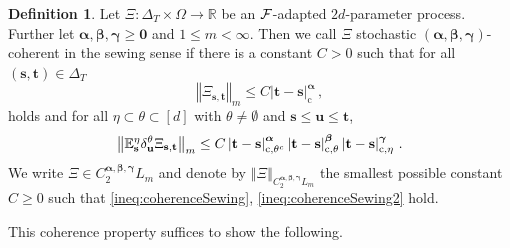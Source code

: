 \documentclass[12pt]{article}
\numberwithin{equation}{section}
\theoremstyle{plain}
\theoremstyle{definition}
\newtheorem{definition}[theorem]{Definition}
\newcommand{\abs}[1]{\left\vert #1 \right\vert}
\newcommand{\compAbs}[1]{\left\vert#1\right\vert_{\text{c}}}
\newcommand{\norm}[1]{\left\Vert #1\right\Vert}
\def\bR{\mathbb{R}}\def\bS{\mathbb{S}}
\def\bE{\mathbb{E}}\def\bW{\mathbb{W}}
\def\fs{\mathbf s}\def\ft{\mathbf t}
\def\fu{\mathbf u}\def\fv{\mathbf v}
\def\falpha{{\boldsymbol\alpha}}
\def\fbeta{{\boldsymbol\beta}}
\def\fgamma{{\boldsymbol\gamma}}
\def\foo{{\boldsymbol 0}}
\begin{document}
\begin{definition}
    Let $\Xi:\Delta_T\times\Omega\to\bR$ be an $\mathcal{F}$-adapted $2d$-parameter process. Further let $\falpha,\fbeta,\fgamma\ge\foo$ and $1\le m <\infty$. Then we call $\Xi$ stochastic $(\falpha,\fbeta,\fgamma)$-coherent in the sewing sense if there is a constant $C>0$ such that for all $(\fs,\ft)\in\Delta_T$ 
    \begin{equation}\label{ineq:coherenceSewing2}
        \norm{\Xi_{\fs,\ft}}_m\le C\compAbs{\ft-\fs}^{\falpha}\,,
    \end{equation}
    holds and for all $\eta\subset\theta\subset[d]$ with $\theta\neq\emptyset$ and $\fs\le\fu\le\ft$,
    \begin{equation}\label{ineq:coherenceSewing}
        \norm{\bE^\eta_\fs \delta^\theta_\fu\Xi_{\fs,\ft}}_m \le C\abs{\ft-\fs}^{\falpha}_{\text c,\theta^c}\abs{\ft-\fs}^{\fbeta}_{\text c,\theta}\abs{\ft-\fs}^{\fgamma}_{\text c,\eta}\,.
    \end{equation}
    We write $\Xi\in C_2^{\falpha,\fbeta,\fgamma} L_m$ and denote by $\norm{\Xi}_{C_2^{\falpha,\fbeta,\fgamma}L_m}$ the smallest possible constant $C\ge 0$ such that \eqref{ineq:coherenceSewing}, \eqref{ineq:coherenceSewing2} hold.
\end{definition}
\noindent This coherence property suffices to show the following.
\end{document}
